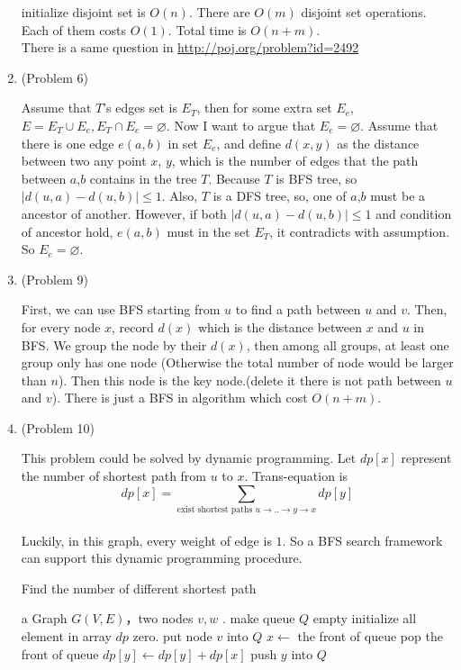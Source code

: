 \normalfont\documentclass[letterpaper,11pt]{article}
\begin{document}
\begin{enumerate}
initialize disjoint set is $O(n)$. There are $O(m)$ disjoint set operations. Each of them costs $O(1)$. Total time is $O(n + m)$.\\
There is a same question in \url{http://poj.org/problem?id=2492}
\item (Problem 6)\par
Assume that $T$'s edges set is $E_T$, then for some extra set $E_e$, $E = E_T \cup E_e, E_T \cap E_e = \varnothing$. Now I want to argue that $E_e = \varnothing$. Assume that there is one edge $e(a,b)$ in set $E_e$, and define $d(x,y)$ as the distance between two any point $x$, $y$, which is the number of edges that the path between $a$,$b$ contains in the tree $T$. Because $T$ is BFS tree, so $|d(u,a) - d(u,b)| \leq 1$. Also, $T$ is a DFS tree, so, one of $a$,$b$ must be a ancestor of another. However, if both $|d(u,a) - d(u,b)| \leq 1$ and condition of ancestor hold, $e(a,b)$ must in the set $E_T$, it contradicts with assumption. So $E_e = \varnothing$.
\item (Problem 9)\par
	First, we can use BFS starting from $u$ to find a path between $u$ and $v$. Then, for every node $x$, record $d(x)$ which is the distance between $x$ and $u$ in BFS. We group the node by their $d(x)$, then among all groups, at least one group only has one node (Otherwise the total number of node would be larger than $n$). Then this node is the key node.(delete it there is not path between $u$ and $v$). There is just a BFS in algorithm which cost $O(n + m)$.
\item (Problem 10)\par
This problem could be solved by dynamic programming. Let $dp[x]$ represent the number of shortest path from $u$ to $x$. Trans-equation is $$dp[x] = \sum_{\text{exist shortest paths } u \to..\to y \to x}{dp[y]}$$\\ Luckily, in this graph, every weight of edge is $1$. So a BFS search framework can support this dynamic programming procedure.
\begin{algorithm*}
\caption{Find the number of different shortest path}
\begin{algorithmic}
	\Require a Graph $G(V,E)$，two nodes $v,w$ .
	\State make queue $Q$ empty
	\State initialize all element in array $dp$ zero.
	\State put node $v$ into $Q$
		\State $x \gets$ the front of queue
		\State pop the front of queue
				\State $dp[y] \gets dp[y] + dp[x]$
				\State push $y$ into $Q$	

\end{algorithmic}
\end{algorithm*}
\end{enumerate}
\end{document}
